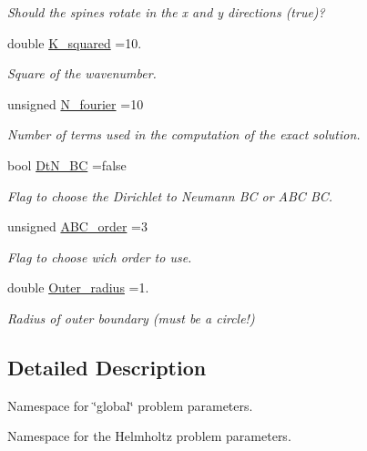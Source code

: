 \begin{DoxyCompactItemize}
\begin{DoxyCompactList}\small\item\em Should the spines rotate in the x and y directions (true)? \end{DoxyCompactList}\item 
double \hyperlink{namespaceGlobalParameters_aae73cb63b27d51a87845c3392cd944eb}{K\+\_\+squared} =10.
\begin{DoxyCompactList}\small\item\em Square of the wavenumber. \end{DoxyCompactList}\item 
unsigned \hyperlink{namespaceGlobalParameters_ae4df03bf0ffa55b741ac846ca7b6c155}{N\+\_\+fourier} =10
\begin{DoxyCompactList}\small\item\em Number of terms used in the computation of the exact solution. \end{DoxyCompactList}\item 
bool \hyperlink{namespaceGlobalParameters_a6e2bba1769e86a5d3db88e2c7062bc63}{Dt\+N\+\_\+\+BC} =false
\begin{DoxyCompactList}\small\item\em Flag to choose the Dirichlet to Neumann BC or A\+BC BC. \end{DoxyCompactList}\item 
unsigned \hyperlink{namespaceGlobalParameters_a552eed3548a269715a95161ad3c4b96a}{A\+B\+C\+\_\+order} =3
\begin{DoxyCompactList}\small\item\em Flag to choose wich order to use. \end{DoxyCompactList}\item 
double \hyperlink{namespaceGlobalParameters_a61b086072a6b8fd38af1a85f1dd1674a}{Outer\+\_\+radius} =1.
\begin{DoxyCompactList}\small\item\em Radius of outer boundary (must be a circle!) \end{DoxyCompactList}\end{DoxyCompactItemize}


\subsection{Detailed Description}
Namespace for \char`\"{}global\char`\"{} problem parameters. 

Namespace for the Helmholtz problem parameters. 


